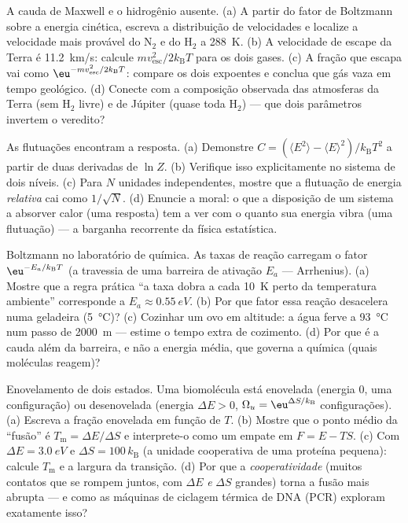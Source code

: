 \begin{exercise}[$\star\star$]\label{exo:b3:canonical-ensemble:7}
A cauda de Maxwell e o hidrogênio ausente. (a) A partir do fator de
Boltzmann sobre a energia cinética, escreva a distribuição de
velocidades e localize a velocidade mais provável do N$_2$ e do H$_2$ a
\qty{288}{K}. (b) A velocidade de escape da Terra é \qty{11.2}{km/s}:
calcule $mv_{\text{esc}}^2/2k_{\text{B}}T$ para os dois gases. (c) A
fração que escapa vai como $\eu^{-mv_{\text{esc}}^2/2k_{\text{B}}T}$:
compare os dois expoentes e conclua que gás vaza em tempo geológico.
(d) Conecte com a composição observada das atmosferas da Terra (sem
H$_2$ livre) e de Júpiter (quase toda H$_2$) --- que dois parâmetros
invertem o veredito?
\end{exercise}

\begin{exercise}[$\star\star$]\label{exo:b3:canonical-ensemble:8}
As flutuações encontram a resposta. (a) Demonstre $C = (\langle E^2\rangle -
\langle E\rangle^2)/k_{\text{B}}T^2$ a partir de duas derivadas de $\ln
Z$. (b) Verifique isso explicitamente no sistema de dois níveis. (c)
Para $N$ unidades independentes, mostre que a flutuação de energia
\emph{relativa} cai como $1/\sqrt N$. (d) Enuncie a moral: o que a
disposição de um sistema a absorver calor (uma resposta) tem a ver com
o quanto sua energia vibra (uma flutuação) --- a barganha recorrente da
física estatística.
\end{exercise}

\begin{exercise}[$\star\star$]\label{exo:b3:canonical-ensemble:9}
Boltzmann no laboratório de química. As taxas de reação carregam o
fator $\eu^{-E_a/k_{\text{B}}T}$ (a travessia de uma barreira de
ativação $E_a$ --- Arrhenius). (a) Mostre que a regra prática ``a taxa
dobra a cada \qty{10}{K} perto da temperatura ambiente'' corresponde a $E_a \approx
\qty{0.55}{eV}$. (b) Por que fator essa reação desacelera
numa geladeira (\qty{5}{\celsius})? (c) Cozinhar um ovo em altitude: a
água ferve a \qty{93}{\celsius} num passo de \qty{2000}{m} --- estime o
tempo extra de cozimento. (d) Por que é a cauda além da barreira, e não
a energia média, que governa a química (quais moléculas reagem)?
\end{exercise}

\begin{exercise}[$\star\star\star$]\label{exo:b3:canonical-ensemble:10}
Enovelamento de dois estados. Uma biomolécula está enovelada (energia
$0$, uma configuração) ou desenovelada (energia $\Delta E > 0$, $\Omega_u =
\eu^{\Delta S/k_{\text{B}}}$ configurações). (a) Escreva a fração enovelada
em função de $T$. (b) Mostre que o ponto médio da ``fusão'' é
$T_{\text{m}} = \Delta E/\Delta S$ e interprete-o como um empate em $F = E -
TS$. (c) Com $\Delta E = \qty{3.0}{eV}$ e $\Delta S =
100\,k_{\text{B}}$ (a unidade cooperativa de uma proteína
pequena): calcule $T_{\text{m}}$ e a largura da transição. (d) Por que
a \emph{cooperatividade} (muitos contatos que se rompem juntos, com
$\Delta E$ \emph{e} $\Delta S$ grandes) torna a fusão mais abrupta ---
e como as máquinas de ciclagem térmica de DNA (PCR) exploram
exatamente isso?
\end{exercise}

